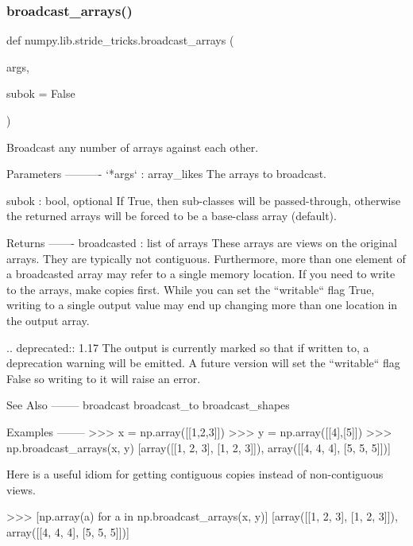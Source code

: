 \subsubsection{\texorpdfstring{broadcast\+\_\+arrays()}{broadcast\_arrays()}}
{\footnotesize\ttfamily def numpy.\+lib.\+stride\+\_\+tricks.\+broadcast\+\_\+arrays (\begin{DoxyParamCaption}\item[{}]{args,  }\item[{}]{subok = {\ttfamily False} }\end{DoxyParamCaption})}

\begin{DoxyVerb}Broadcast any number of arrays against each other.

Parameters
----------
`*args` : array_likes
    The arrays to broadcast.

subok : bool, optional
    If True, then sub-classes will be passed-through, otherwise
    the returned arrays will be forced to be a base-class array (default).

Returns
-------
broadcasted : list of arrays
    These arrays are views on the original arrays.  They are typically
    not contiguous.  Furthermore, more than one element of a
    broadcasted array may refer to a single memory location. If you need
    to write to the arrays, make copies first. While you can set the
    ``writable`` flag True, writing to a single output value may end up
    changing more than one location in the output array.

    .. deprecated:: 1.17
        The output is currently marked so that if written to, a deprecation
        warning will be emitted. A future version will set the
        ``writable`` flag False so writing to it will raise an error.

See Also
--------
broadcast
broadcast_to
broadcast_shapes

Examples
--------
>>> x = np.array([[1,2,3]])
>>> y = np.array([[4],[5]])
>>> np.broadcast_arrays(x, y)
[array([[1, 2, 3],
       [1, 2, 3]]), array([[4, 4, 4],
       [5, 5, 5]])]

Here is a useful idiom for getting contiguous copies instead of
non-contiguous views.

>>> [np.array(a) for a in np.broadcast_arrays(x, y)]
[array([[1, 2, 3],
       [1, 2, 3]]), array([[4, 4, 4],
       [5, 5, 5]])]\end{DoxyVerb}
 \mbox{\label{namespacenumpy_1_1lib_1_1stride__tricks_ad084aae79f1d012a9faf77d6db2343e2}} 
